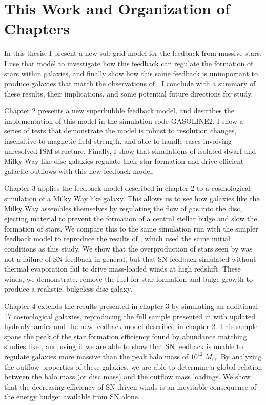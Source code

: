 \section{This Work and Organization of Chapters}
In this thesis, I present a new sub-grid model for the feedback from massive
stars.  I use that model to investigate how this feedback can regulate the
formation of stars within galaxies, and finally show how this same feedback is
unimportant to produce galaxies that match the observations of
\citet{McGaugh2016}.  I conclude with a summary of these results, their
implications, and some potential future directions for study.

Chapter 2 presents a new superbubble feedback model, and describes the
implementation of this model in the simulation code {\sc GASOLINE2}.  I show a
series of tests that demonstrate the model is robust to resolution changes, insensitive
to magnetic field strength, and able to handle cases involving unresolved ISM
structure.  Finally, I show that simulations of isolated dwarf and Milky Way
like disc galaxies regulate their star formation and drive efficient galactic
outflows with this new feedback model.

Chapter 3 applies the feedback model described in chapter 2 to a cosmological
simulation of a Milky Way like galaxy.  This allows us to see how galaxies like
the Milky Way assembles themselves by regulating the flow of gas into the disc,
ejecting material to prevent the formation of a central stellar bulge and slow
the formation of stars.  We compare this to the same simulation run with the
simpler \citet{Stinson2006} feedback model to reproduce the results of
\citet{Stinson2010}, which used the same initial conditions as this study.  We
show that the overproduction of stars seen by \citet{Stinson2010} was not a
failure of SN feedback in general, but that SN feedback simulated without 
thermal evaporation fail to drive mass-loaded winds at high redshift.  These
winds, we demonstrate, remove the fuel for star formation and bulge growth to
produce a realistic, bulgeless disc galaxy.

Chapter 4 extends the results presented in chapter 3 by simulating an additional
17 cosmological galaxies, reproducing the full sample presented in
\citet{Stinson2010} with updated hydrodynamics and the new feedback model
described in chapter 2.  This sample spans the peak of the star formation
efficiency found by abundance matching studies like \citet{Moster2013}, and
using it we are able to show that SN feedback is unable to regulate
galaxies more massive than the peak halo mass of $10^{12}\;M_\odot$.  By
analyzing the outflow properties of these galaxies, we are able to determine a
global relation between the halo mass (or disc mass) and the outflow mass
loadings.  We show that the decreasing efficiency of SN-driven winds is an
inevitable consequence of the energy budget available from SN alone.

